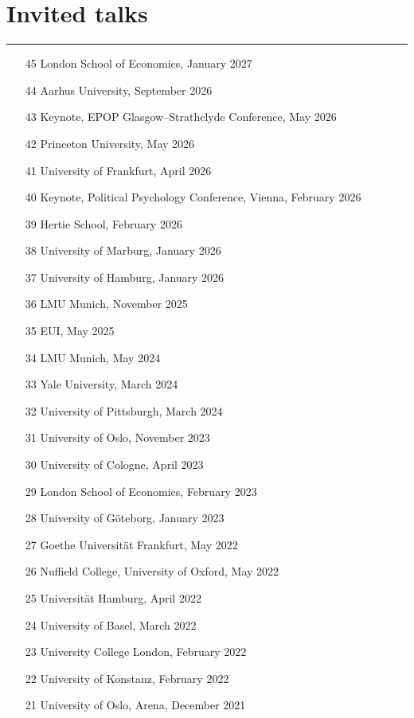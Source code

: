 \section*{Invited talks}\vspace{-2em}\rule{\textwidth}{0.5pt}\vspace{1em}
\begin{enumerate}[topsep=0pt, noitemsep, leftmargin=3\labelsep]
    \item[45] London School of Economics, January 2027
    \item[44] Aarhus University, September 2026
    \item[43] Keynote, EPOP Glasgow–Strathclyde Conference, May 2026
    \item[42] Princeton University, May 2026
    \item[41] University of Frankfurt, April 2026
    \item[40] Keynote, Political Psychology Conference, Vienna, February 2026
    \item[39] Hertie School, February 2026
    \item[38] University of Marburg, January 2026
    \item[37] University of Hamburg, January 2026
    \item[36] LMU Munich, November 2025
    \item[35] EUI, May 2025
	\item[34] LMU Munich, May 2024
	\item[33] Yale University, March 2024
	\item[32] University of Pittsburgh, March 2024
	\item[31] University of Oslo, November 2023
	\item[30] University of Cologne, April 2023
	\item[29] London School of Economics, February 2023
	\item[28] University of Göteborg, January 2023
	\item[27] Goethe Universität Frankfurt, May 2022
	\item[26] Nuffield College, University of Oxford, May 2022
	\item[25] Universität Hamburg, April 2022
	\item[24] University of Basel, March 2022
	\item[23] University College London, February 2022
	\item[22] University of Konstanz, February 2022
	\item[21] University of Oslo, Arena, December 2021

\end{enumerate}
